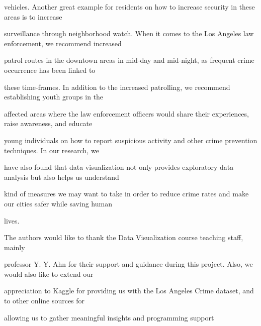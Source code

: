 \documentclass[sigconf]{acmart}
\begin{document}
vehicles. Another great example for residents on how to increase security in these areas is to increase 

surveillance through neighborhood watch. When it comes to the Los Angeles law enforcement, we recommend increased 

patrol routes in the downtown areas in mid-day and mid-night, as frequent crime occurrence has been linked to 

these time-frames. In addition to the increased patrolling, we recommend establishing youth groups in the 

affected areas where the law enforcement officers would share their experiences, raise awareness, and educate 

young individuals on how to report suspicious activity and other crime prevention techniques. In our research, we 

have also found that data visualization not only  provides exploratory data analysis but also helps us understand 

kind of measures we may want to take in order to reduce crime rates and make our cities safer while saving human 

lives.

\begin{acks}

  The authors would like to thank the Data Visualization course teaching staff, mainly 

professor Y. Y. Ahn for their support and guidance during this project. Also, we would also like to extend our 

appreciation to Kaggle for providing us with the Los Angeles Crime dataset, and to other online sources for 

allowing us to gather meaningful insights and programming support

\end{acks}


 

\appendix

%
\end{document}
